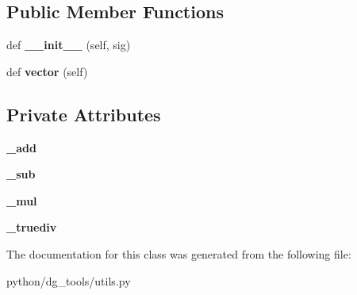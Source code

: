 \subsection*{Public Member Functions}
\begin{DoxyCompactItemize}
\item 
def {\bfseries \+\_\+\+\_\+init\+\_\+\+\_\+} (self, sig)\hypertarget{classpython_1_1dg__tools_1_1utils_1_1DoubleSignal_ad243511463fed20c94dfe8bd540e71c5}{}\label{classpython_1_1dg__tools_1_1utils_1_1DoubleSignal_ad243511463fed20c94dfe8bd540e71c5}

\item 
def {\bfseries vector} (self)\hypertarget{classpython_1_1dg__tools_1_1utils_1_1DoubleSignal_a02d314619075a78962edcb8a2901fbdd}{}\label{classpython_1_1dg__tools_1_1utils_1_1DoubleSignal_a02d314619075a78962edcb8a2901fbdd}

\end{DoxyCompactItemize}
\subsection*{Private Attributes}
\begin{DoxyCompactItemize}
\item 
{\bfseries \+\_\+add}\hypertarget{classpython_1_1dg__tools_1_1utils_1_1DoubleSignal_ac1d0543ec22d2d0c77c0e649ddff51fa}{}\label{classpython_1_1dg__tools_1_1utils_1_1DoubleSignal_ac1d0543ec22d2d0c77c0e649ddff51fa}

\item 
{\bfseries \+\_\+sub}\hypertarget{classpython_1_1dg__tools_1_1utils_1_1DoubleSignal_a3be3dbf0972f431f8061121d87f24016}{}\label{classpython_1_1dg__tools_1_1utils_1_1DoubleSignal_a3be3dbf0972f431f8061121d87f24016}

\item 
{\bfseries \+\_\+mul}\hypertarget{classpython_1_1dg__tools_1_1utils_1_1DoubleSignal_a61864eb195e63e9c896c4ebafa24625c}{}\label{classpython_1_1dg__tools_1_1utils_1_1DoubleSignal_a61864eb195e63e9c896c4ebafa24625c}

\item 
{\bfseries \+\_\+truediv}\hypertarget{classpython_1_1dg__tools_1_1utils_1_1DoubleSignal_a7b4c19d2b4c00b18f6674951f8750655}{}\label{classpython_1_1dg__tools_1_1utils_1_1DoubleSignal_a7b4c19d2b4c00b18f6674951f8750655}

\end{DoxyCompactItemize}


The documentation for this class was generated from the following file\+:\begin{DoxyCompactItemize}
\item 
python/dg\+\_\+tools/utils.\+py\end{DoxyCompactItemize}

